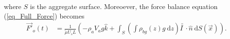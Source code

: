 where $S$ is the aggregate surface. 
Moreoever, the force balance equation (\ref{eq_Full_Force}) becomes
\begin{align*}
	 \vec{F'}_o(t)
	 & =
	  \frac{1}{\tilde{\mu} U_s L} 
	  \left(
	-   \rho_a V_a g \hat{k}
	  +
	   \int_{S} \left( 
	   \int \rho_{bg}(z) g \ \textrm{d}z 
	   \right) \bar{\bar{I \ }}  \cdot
	  \hat{n} \ \textrm{d}S (\vec{x})
	\right).
\label{eq_Full_Force_nonD}
\end{align*}

